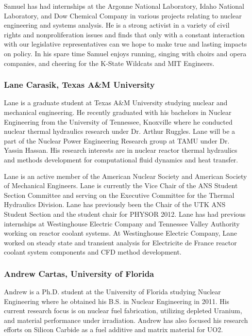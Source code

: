 Samuel has had internships at the Argonne National Laboratory, Idaho National
Laboratory, and Dow Chemical Company in various projects relating to nuclear
engineering and systems analysis. He is a strong activist in a variety of civil
rights and nonproliferation issues and finds that only with a constant
interaction with our legislative representatives can we hope to make true and
lasting impacts on policy. In his spare time Samuel enjoys running, singing with
choirs and opera companies, and cheering for the K-State Wildcats and MIT
Engineers.

\subsubsection*{Lane Carasik, Texas A\&M University}

Lane is a graduate student at Texas A\&M University studying nuclear and
mechanical engineering. He recently graduated with his bachelors in Nuclear
Engineering from the University of Tennessee, Knoxville where he conducted
nuclear thermal hydraulics research under Dr. Arthur Ruggles. Lane will be a
part of the Nuclear Power Engineering Research group at TAMU under Dr. Yassin
Hassan. His research interests are in nuclear reactor thermal hydraulics and
methods development for computational fluid dynamics and heat transfer.

Lane is an active member of the American Nuclear Society and American Society of
Mechanical Engineers. Lane is currently the Vice Chair of the ANS Student
Section Committee and serving on the Executive Committee for the Thermal
Hydraulics Division. Lane has previously been the Chair of the UTK ANS Student
Section and the student chair for PHYSOR 2012. Lane has had previous internships
at Westinghouse Electric Company and Tennessee Valley Authority working on
reactor coolant systems. At Westinghouse Electric Company, Lane worked on steady
state and transient analysis for Electricite de France reactor coolant system
components and CFD method development.

\subsubsection*{Andrew Cartas, University of Florida}

Andrew is a Ph.D. student at the University of Florida studying Nuclear
Engineering where he obtained his B.S. in Nuclear Engineering in 2011. His
current research focus is on nuclear fuel fabrication, utilizing depleted
Uranium, and material performance under irradiation. Andrew has also focused his
research efforts on Silicon Carbide as a fuel additive and matrix material for
UO2.

